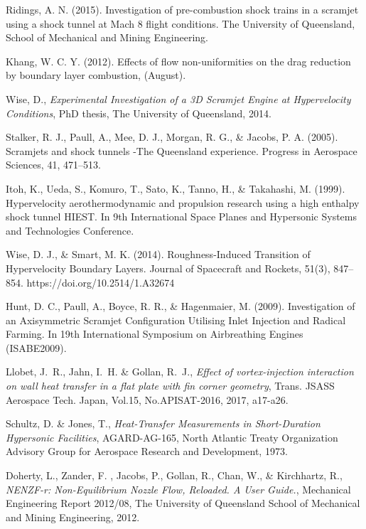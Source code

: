 \documentclass{AIAA}
\begin{document}
\begin{thebibliography}{}
Ridings, A. N. (2015). Investigation of pre-combustion shock trains in a scramjet using a shock tunnel at Mach 8 flight conditions. The University of Queensland, School of Mechanical and Mining Engineering.

Khang, W. C. Y. (2012). Effects of flow non-uniformities on the drag reduction by boundary layer combustion, (August).

Wise, D., {\it Experimental Investigation of a 3D Scramjet Engine at Hypervelocity Conditions}, PhD thesis, The University of Queensland, 2014.

Stalker, R. J., Paull, A., Mee, D. J., Morgan, R. G., \& Jacobs, P. A. (2005). Scramjets and shock tunnels -The Queensland experience. Progress in Aerospace Sciences, 41, 471–513.

Itoh, K., Ueda, S., Komuro, T., Sato, K., Tanno, H., \& Takahashi, M. (1999). Hypervelocity aerothermodynamic and propulsion research using a high enthalpy shock tunnel HIEST. In 9th International Space Planes and Hypersonic Systems and Technologies Conference.

Wise, D. J., \& Smart, M. K. (2014). Roughness-Induced Transition of Hypervelocity Boundary Layers. Journal of Spacecraft and Rockets, 51(3), 847–854. https://doi.org/10.2514/1.A32674

Hunt, D. C., Paull, A., Boyce, R. R., \& Hagenmaier, M. (2009). Investigation of an Axisymmetric Scramjet Configuration Utilising Inlet Injection and Radical Farming. In 19th International Symposium on Airbreathing Engines (ISABE2009).

Llobet, J.~R., Jahn, I.~H. \& Gollan, R.~J., {\it Effect of vortex-injection interaction on wall heat transfer in a flat plate with fin corner geometry}, Trans. JSASS Aerospace Tech. Japan, Vol.15, No.APISAT-2016, 2017, a17-a26. 

Schultz, D. \& Jones, T., {\it Heat-Transfer Measurements in Short-Duration Hypersonic Facilities}, AGARD-AG-165, North Atlantic Treaty Organization Advisory Group for Aerospace Research and Development, 1973.

Doherty, L., Zander, F. , Jacobs, P., Gollan, R., Chan, W., \& Kirchhartz, R., {\it NENZF-r: Non-Equilibrium Nozzle Flow, Reloaded. A User Guide.}, Mechanical Engineering Report 2012/08, The University of Queensland School of Mechanical and Mining Engineering, 2012.


\end{thebibliography}
\end{document}
